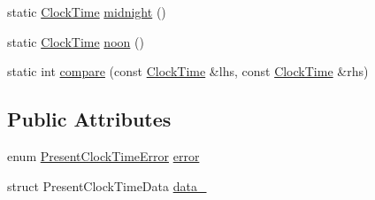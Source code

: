 \begin{DoxyCompactItemize}
\item 
static \hyperlink{structClockTime}{\-Clock\-Time} \hyperlink{structClockTime_a7baab35d60ad3a2236c14133d8d0083b}{midnight} ()
\item 
static \hyperlink{structClockTime}{\-Clock\-Time} \hyperlink{structClockTime_ae206b86808ff1d0158cbc920eb289797}{noon} ()
\item 
static int \hyperlink{structClockTime_a4c185648dcfc28f46ac3fc700b3415c2}{compare} (const \hyperlink{structClockTime}{\-Clock\-Time} \&lhs, const \hyperlink{structClockTime}{\-Clock\-Time} \&rhs)
\end{DoxyCompactItemize}
\subsection*{\-Public \-Attributes}
\begin{DoxyCompactItemize}
\item 
enum \hyperlink{clock-time_8h_a40f97cceae12156ea6da9bd1c170d455}{\-Present\-Clock\-Time\-Error} \hyperlink{structClockTime_a58f5305f36468eee0d1c489b5d72d717}{error}
\item 
struct \-Present\-Clock\-Time\-Data \hyperlink{structClockTime_a3fe115dffef3ba153e1fff6e0b2c0a23}{data\-\_\-}
\end{DoxyCompactItemize}
